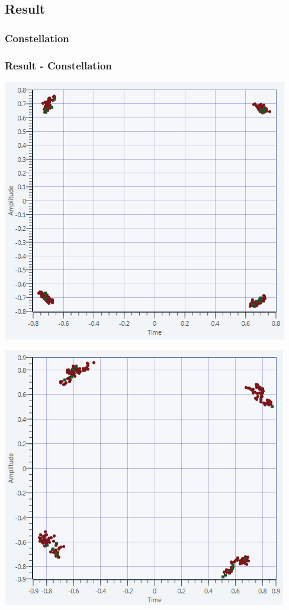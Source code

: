 \documentclass[11pt]{beamer}
\begin{document}
\subsection{Result}
\subsubsection{Constellation}

\begin{frame}
\frametitle{Result - Constellation}
\begin{minipage}[b]{0.48\linewidth}
        \centering \includegraphics[scale=0.37]{img/USRP_carrieroffset_227.png}
    \end{minipage}\hfill
    \begin{minipage}[b]{0.48\linewidth}
         \centering \includegraphics[scale=0.37]{img/USRP_carrieroffset_1818}
    \end{minipage}

\end{frame}
\end{document}
